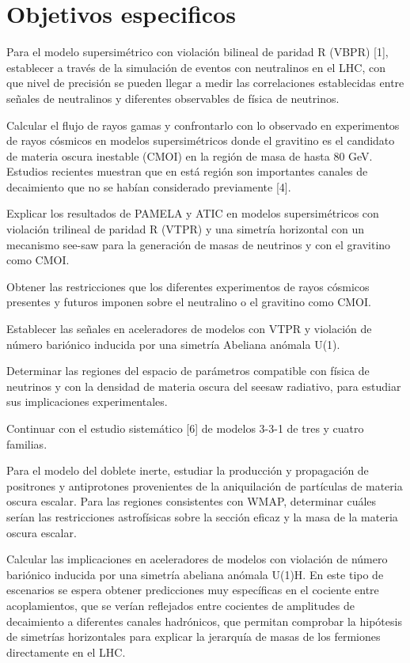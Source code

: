\section{Objetivos especificos}

Para el modelo supersimétrico con violación bilineal de paridad R (VBPR) [1],  establecer a través de la simulación de eventos con neutralinos en el LHC, con que nivel de precisión se pueden llegar a medir las correlaciones establecidas entre señales de neutralinos y diferentes observables de física de neutrinos.

Calcular el flujo de rayos gamas y confrontarlo con lo observado en experimentos de rayos cósmicos en modelos supersimétricos donde el gravitino es el candidato de materia oscura inestable (CMOI) en la región de masa de hasta 80 GeV. Estudios recientes  muestran que en está región son importantes canales de decaimiento que no se habían considerado previamente [4]. 

Explicar los resultados de PAMELA y ATIC en modelos supersimétricos con violación trilineal de paridad R (VTPR) y una simetría horizontal con un mecanismo see-saw para la generación de masas de neutrinos y con el gravitino como CMOI.

Obtener las restricciones que los diferentes experimentos de rayos cósmicos presentes y futuros imponen sobre el neutralino o el gravitino como CMOI.

Establecer las señales en aceleradores de modelos con VTPR y violación de número bariónico inducida por una simetría Abeliana anómala U(1). 

Determinar las regiones del espacio de parámetros compatible con física de neutrinos y con la densidad de materia oscura del seesaw radiativo, para estudiar sus implicaciones experimentales.

Continuar con el estudio sistemático [6] de modelos 3-3-1 de tres y cuatro familias.

\newpage{}

Para el modelo del doblete inerte, estudiar la producción y propagación de positrones y antiprotones  provenientes de  la aniquilación de partículas de materia oscura escalar. Para las regiones consistentes con WMAP, determinar cuáles serían las restricciones astrofísicas sobre la sección eficaz y la masa de la materia oscura escalar.  

Calcular las implicaciones en aceleradores de modelos con violación de número bariónico inducida por una simetría abeliana anómala U(1)H. En este tipo de escenarios se espera obtener predicciones muy específicas en el cociente entre acoplamientos, que se verían reflejados entre cocientes de amplitudes de decaimiento a diferentes canales hadrónicos, que permitan comprobar la hipótesis de simetrías horizontales para explicar la jerarquía de masas de los fermiones directamente en el LHC. 

